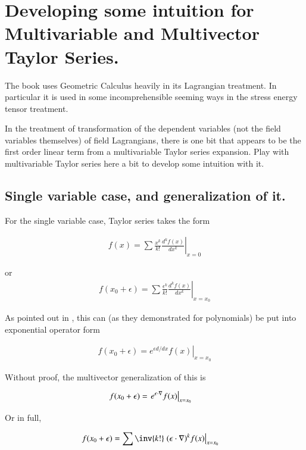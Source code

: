 \chapter{Developing some intuition for Multivariable and Multivector Taylor Series.}\label{chap:PJmultiTaylors}
\date{April 28, 2009.  multivectorTaylors.tex}

The book \citep{doran2003gap} uses Geometric Calculus heavily in its 
Lagrangian treatment.  In particular it is used in some incomprehensible seeming ways in the 
stress energy tensor treatment.

In the treatment of transformation of the dependent variables (not the field
variables themselves) of field Lagrangians, there is one bit that
appears to be the first order linear term from a multivariable Taylor
series expansion.  Play with multivariable Taylor series here a bit
to develop some intuition with it.

\section{Single variable case, and generalization of it. }

For the single variable case, Taylor series takes the form

\begin{align}
f(x) = \sum \frac{x^k}{k!} \left. \frac{d^k f(x)}{dx^k} \right\vert_{x=0}
\end{align}

or
\begin{align}
f(x_0 + \epsilon) = \sum \frac{\epsilon^k}{k!} \left. \frac{d^k f(x)}{dx^k} \right\vert_{x=x_0}
\end{align}

As pointed out in \citep{byron1992mca}, this can (as they demonstrated for polynomials) be put into exponential 
operator form

\begin{align}
f(x_0 + \epsilon) = \left. e^{\epsilon d/dx} f(x) \right\vert_{x=x_0}
\end{align}

Without proof, the multivector generalization of this is

\begin{align}\label{eqn:multivector_taylors:taylorsExponential}
f(x_0 + \epsilon) 
&= \left. e^{\epsilon \cdot \nabla} f(x) \right\vert_{x=x_0} 
\end{align}

Or in full,

\begin{align}\label{eqn:multivector_taylors:taylorMulti}
f(x_0 + \epsilon) 
&= \sum \inv{k!} \left. {(\epsilon \cdot \grad)^k} f(x) \right\vert_{x=x_0}
\end{align}

